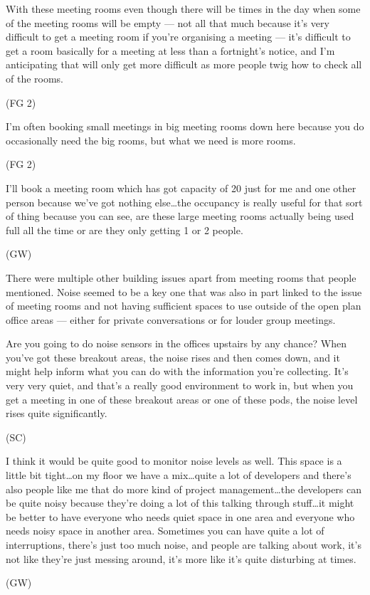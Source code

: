 \begin{qt}With these meeting rooms even though there will be times in the day
when some of the meeting rooms will be empty --- not all that much
because it’s very difficult to get a meeting room if you’re organising
a meeting --- it’s difficult to get a room basically for a meeting at
less than a fortnight’s notice, and I’m anticipating that will only
get more difficult as more people twig how to check all of the rooms.\end{qt}
(FG 2)

\begin{qt}I’m often booking small meetings in big meeting rooms
  down here because you do occasionally need the big rooms, but what
  we need is more rooms.\end{qt} (FG 2)

\begin{qt}I’ll book a meeting room which has got capacity of 20 just for me and
one other person because we’ve got nothing else…the occupancy is
really useful for that sort of thing because you can see, are these
large meeting rooms actually being used full all the time or are they
only getting 1 or 2 people.\end{qt} (GW)

There were multiple other building issues apart from meeting rooms
that people mentioned. Noise seemed to be a key one that was also in
part linked to the issue of meeting rooms and not having sufficient
spaces to use outside of the open plan office areas --- either for
private conversations or for louder group meetings.

\begin{qt}Are you going to do noise sensors in the offices upstairs by any
chance? When you’ve got these breakout areas, the noise rises and then
comes down, and it might help inform what you can do with the
information you’re collecting. It’s very very quiet, and that’s a
really good environment to work in, but when you get a meeting in one
of these breakout areas or one of these pods, the noise level rises
quite significantly.\end{qt} (SC)

\begin{qt}I think it would be quite good to monitor noise levels as well. This
space is a little bit tight\ldots on my floor we have a mix\ldots quite a lot of
developers and there’s also people like me that do more kind of
project management\ldots{}the developers can be quite noisy because they’re
doing a lot of this talking through stuff\ldots{}it might be better to have
everyone who needs quiet space in one area and everyone who needs
noisy space in another area. Sometimes you can have quite a lot of
interruptions, there’s just too much noise, and people are talking
about work, it’s not like they’re just messing around, it’s more like
it’s quite disturbing at times.\end{qt} (GW)


